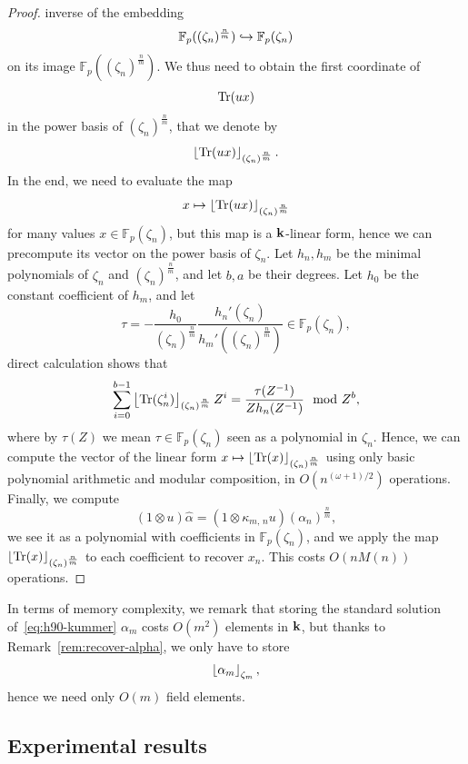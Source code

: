 \begin{proof}
inverse of the embedding
\[
  \mathbb{F}_p( (\zeta_n)^{\frac{n}{m}})\hookrightarrow\mathbb{F}_p(\zeta_n) 
\]
on its image $\mathbb{F}_p((\zeta_n)^{\frac{n}{m}})$. We thus need to obtain
the first coordinate of
\[
  \operatorname{Tr}(ux)
\]
in the power basis of $(\zeta_n)^{\frac{n}{m}}$, that we denote by
\[
  \left\lfloor \operatorname{Tr}(ux) \right\rfloor_{(\zeta_n)^{\frac{n}{m}}}.
\]
In the end, we need to evaluate the map
\[
  x\mapsto\left\lfloor \operatorname{Tr}(ux) \right\rfloor_{(\zeta_n)^{\frac{n}{m}}}
\]
for many values $x\in\mathbb{F}_{p}(\zeta_n)$, but this map is a $\mathbf{k}$-linear
form, hence we can precompute its vector on the power basis of $\zeta_n$.
Let $h_n,h_m$ be the minimal polynomials of $\zeta_n$ and
$(\zeta_{n})^{\frac{n}{m}}$, and let $b,a$ be their degrees.
Let $h_0$ be the constant coefficient of $h_m$, and let
\[
\tau = -\frac{h_0}{(\zeta_n)^{\frac{n}{m}}}
\frac{h_n'(\zeta_n)}{h_m'((\zeta_n)^{\frac{n}{m}})}\in \mathbb{F}_p(\zeta_n),
\]
 direct calculation shows that
\begin{equation*}
  \sum_{i=0}^{b-1} \left\lfloor \operatorname{Tr}(\zeta_n^i) \right\rfloor_{(\zeta_{n})^{\frac{n}{m}}}Z^i =
  \frac{\tau(Z^{-1})}{Zh_n(Z^{-1})}  \mod Z^b,
\end{equation*}
where by $\tau(Z)$ we mean $\tau\in\mathbb{F}_p(\zeta_n)$ seen as a
polynomial in $\zeta_n$. %
Hence, we can compute the vector of the linear form
$x\mapsto\left\lfloor \operatorname{Tr}(x) \right\rfloor_{(\zeta_{n})^{\frac{n}{m}}}$ using only basic polynomial
arithmetic and modular composition, \ie in $O(n^{(\omega+1)/2})$
operations. Finally, we compute
\[
  (1\otimes u)\hat\alpha = (1\otimes \kappa_{m,\,n}u)(\alpha_n)^{\frac{n}{m}},
\]
we see it as a
polynomial with coefficients in $\mathbb{F}_p(\zeta_n)$, and we apply the
map $\left\lfloor \operatorname{Tr}(x) \right\rfloor_{(\zeta_n)^{\frac{n}{m}}}$ to each coefficient to recover
$x_n$.
This costs $O(nM(n))$ operations.
\end{proof}
In terms of memory complexity, we remark that storing the standard solution
of~\eqref{eq:h90-kummer} $\alpha_m$ costs $O(m^2)$ elements in $\mathbf{k}$, but thanks to
Remark~\ref{rem:recover-alpha}, we only have to store
\[
  \left\lfloor \alpha_m \right\rfloor_{\zeta_m},
\]
hence we need only $O(m)$ field elements.

\subsection{Experimental results}

